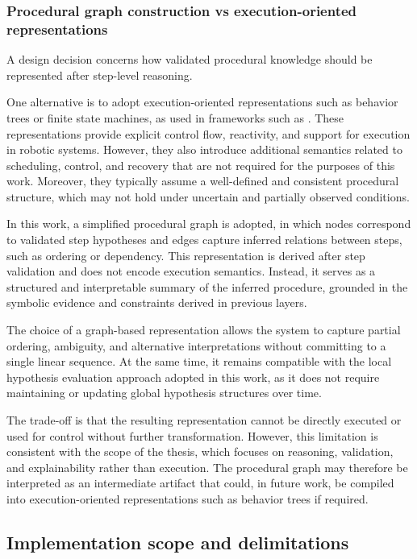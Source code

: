 \documentclass[11pt,titlepage,openright]{book}
\begin{document}
\subsubsection{Procedural graph construction vs execution-oriented representations}

A design decision concerns how validated procedural knowledge should be represented after step-level reasoning.

One alternative is to adopt execution-oriented representations such as behavior trees or finite state machines, as used in frameworks such as \citep{Zhao2025VideoToBT}. These representations provide explicit control flow, reactivity, and support for execution in robotic systems. However, they also introduce additional semantics related to scheduling, control, and recovery that are not required for the purposes of this work. Moreover, they typically assume a well-defined and consistent procedural structure, which may not hold under uncertain and partially observed conditions.

In this work, a simplified procedural graph is adopted, in which nodes correspond to validated step hypotheses and edges capture inferred relations between steps, such as ordering or dependency. This representation is derived after step validation and does not encode execution semantics. Instead, it serves as a structured and interpretable summary of the inferred procedure, grounded in the symbolic evidence and constraints derived in previous layers.

The choice of a graph-based representation allows the system to capture partial ordering, ambiguity, and alternative interpretations without committing to a single linear sequence. At the same time, it remains compatible with the local hypothesis evaluation approach adopted in this work, as it does not require maintaining or updating global hypothesis structures over time.

The trade-off is that the resulting representation cannot be directly executed or used for control without further transformation. However, this limitation is consistent with the scope of the thesis, which focuses on reasoning, validation, and explainability rather than execution. The procedural graph may therefore be interpreted as an intermediate artifact that could, in future work, be compiled into execution-oriented representations such as behavior trees if required.

\subsection{Implementation scope and delimitations}
\end{document}
